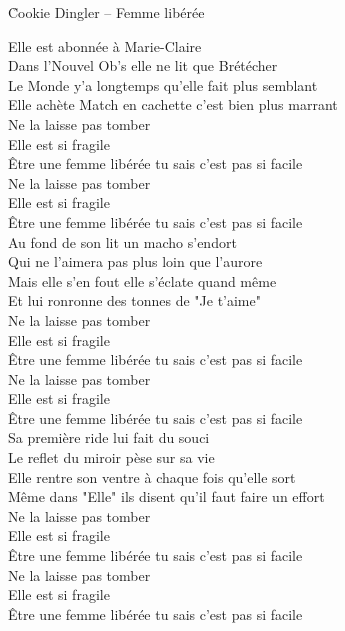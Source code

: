 \documentclass{novel}
\begin{document}
\newpage
\small
\h*{Cookie Dingler – Femme libérée}
\begin{multicols}{2}
Elle est abonnée à Marie-Claire \\
Dans l'Nouvel Ob's elle ne lit que Brétécher \\
Le Monde y'a longtemps qu'elle fait plus semblant \\
Elle achète Match en cachette c'est bien plus marrant \\

Ne la laisse pas tomber \\
Elle est si fragile \\
Être une femme libérée tu sais c'est pas si facile \\
Ne la laisse pas tomber \\
Elle est si fragile \\
Être une femme libérée tu sais c'est pas si facile \\

Au fond de son lit un macho s'endort \\
Qui ne l'aimera pas plus loin que l'aurore \\
Mais elle s'en fout elle s'éclate quand même \\
Et lui ronronne des tonnes de "Je t'aime" \\

Ne la laisse pas tomber \\
Elle est si fragile \\
Être une femme libérée tu sais c'est pas si facile \\
Ne la laisse pas tomber \\
Elle est si fragile \\
Être une femme libérée tu sais c'est pas si facile \\

Sa première ride lui fait du souci \\
Le reflet du miroir pèse sur sa vie \\
Elle rentre son ventre à chaque fois qu'elle sort \\
Même dans "Elle" ils disent qu'il faut faire un effort \\

Ne la laisse pas tomber \\
Elle est si fragile \\
Être une femme libérée tu sais c'est pas si facile \\
Ne la laisse pas tomber \\
Elle est si fragile \\
Être une femme libérée tu sais c'est pas si facile \\


\end{multicols}
\end{document}
